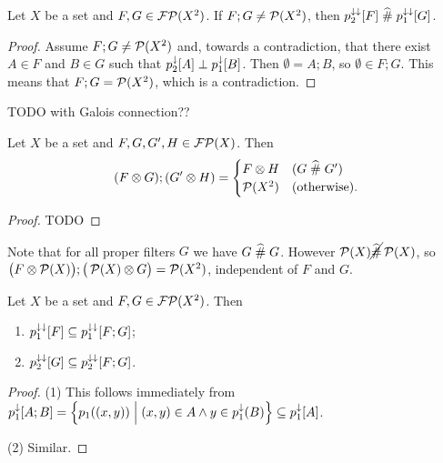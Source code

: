 \begin{lemma} \label{meshingFilterComposition}
Let $X$ be a set and $F,G\in\operatorname{\mathcal{FP}}(X^2)$. If $F;G \neq \operatorname{\mathcal{P}}(X^2)$, then $p_2^{\downarrow\downarrow}[F]\mathrel{\widehat{\#}} p_1^{\downarrow\downarrow}[G]$.
\end{lemma}
\begin{proof}
Assume $F;G \neq \operatorname{\mathcal{P}}(X^2)$ and, towards a contradiction, that there exist $A\in F$ and $B\in G$ such that $p_2^{\downarrow}[A]\perp p_1^{\downarrow}[B]$. Then $\emptyset = A;B$, so $\emptyset \in F;G$. This means that $F;G = \operatorname{\mathcal{P}}(X^2)$, which is a contradiction.
\end{proof}
TODO with Galois connection??

\begin{lemma} \label{compositionProductFilters}
Let $X$ be a set and $F,G, G', H\in\operatorname{\mathcal{FP}}(X)$. Then
\[ (F\otimes G);(G'\otimes H) = \begin{cases}
F\otimes H & (G\mathrel{\widehat{\#}} G') \\
\operatorname{\mathcal{P}}(X ^2) & (\text{otherwise}).
\end{cases}  \]
\end{lemma}
\begin{proof}
TODO
\end{proof}

Note that for all proper filters $G$ we have $G\mathrel{\widehat{\#}} G$. However $\operatorname{\mathcal{P}}(X)\cancel{\mathrel{\widehat{\#}}}\operatorname{\mathcal{P}}(X)$, so $\big(F\otimes \operatorname{\mathcal{P}}(X)\big);\big(\operatorname{\mathcal{P}}(X)\otimes G\big) = \operatorname{\mathcal{P}}(X^2)$, independent of $F$ and $G$.

\begin{lemma} \label{componentInclusionsFilterComposition}
Let $X$ be a set and $F,G\in\operatorname{\mathcal{FP}}(X^2)$. Then
\begin{enumerate}
\item $p_1^{\downarrow\downarrow}[F]\subseteq p_1^{\downarrow\downarrow}[F;G]$;
\item $p_2^{\downarrow\downarrow}[G]\subseteq p_2^{\downarrow\downarrow}[F;G]$.
\end{enumerate}
\end{lemma}
\begin{proof}
(1) This follows immediately from $p_1^{\downarrow}[A;B] = \left\{ p_1((x,y)) \;\middle|\; (x,y)\in A \land y\in p_1^{\downarrow}(B) \right\} \subseteq p_1^{\downarrow}[A]$.

(2) Similar.
\end{proof}

